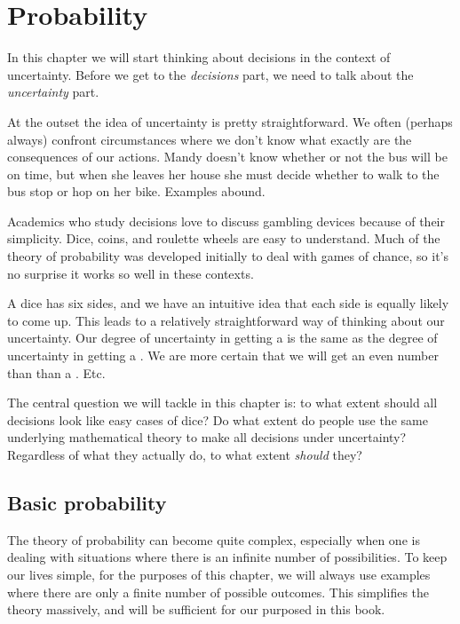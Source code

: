 \chapter{Probability}
\label{c:probability}

In this chapter we will start thinking about decisions in the context of uncertainty.  Before we get to the {\it decisions} part, we need to talk about the {\it uncertainty} part.

At the outset the idea of uncertainty is pretty straightforward. We often (perhaps always) confront circumstances where we don't know what exactly are the consequences of our actions. Mandy doesn't know whether or not the bus will be on time, but when she leaves her house she must decide whether to walk to the bus stop or hop on her bike. Examples abound.

Academics who study decisions love to discuss gambling devices because of their simplicity.  Dice, coins, and roulette wheels are easy to understand.  Much of the theory of probability was developed initially to deal with games of chance, so it's no surprise it works so well in these contexts.

A dice has six sides, and we have an intuitive idea that each side is equally likely to come up.  This leads to a relatively straightforward way of thinking about our uncertainty.  Our degree of uncertainty in getting a  is the same as the degree of uncertainty in getting a .  We are more certain that we will get an even number than than a .  Etc.


The central question we will tackle in this chapter is: to what extent should all decisions look like easy cases of dice? Do what extent do people use the same underlying mathematical theory to make all decisions under uncertainty? Regardless of what they actually do, to what extent {\it should} they?

\section{Basic probability}

The theory of probability can become quite complex, especially when one is dealing with situations where there is an infinite number of possibilities.  To keep our lives simple, for the purposes of this chapter, we will always use examples where there are only a finite number of possible outcomes.  This simplifies the theory massively, and will be sufficient for our purposed in this book.

